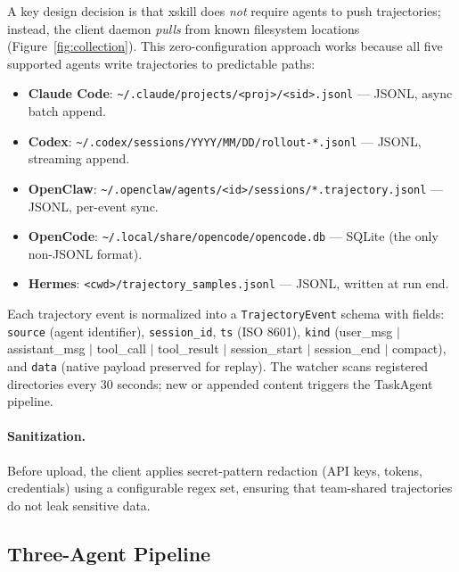 \documentclass[11pt]{article}
\begin{document}
A key design decision is that xskill does \emph{not} require agents to push trajectories; instead, the client daemon \emph{pulls} from known filesystem locations (Figure~\ref{fig:collection}). This zero-configuration approach works because all five supported agents write trajectories to predictable paths:

\begin{itemize}
    \item \textbf{Claude Code}: \texttt{\~{}/.claude/projects/<proj>/<sid>.jsonl} --- JSONL, async batch append.
    \item \textbf{Codex}: \texttt{\~{}/.codex/sessions/YYYY/MM/DD/rollout-*.jsonl} --- JSONL, streaming append.
    \item \textbf{OpenClaw}: \texttt{\~{}/.openclaw/agents/<id>/sessions/*.trajectory.jsonl} --- JSONL, per-event sync.
    \item \textbf{OpenCode}: \texttt{\~{}/.local/share/opencode/opencode.db} --- SQLite (the only non-JSONL format).
    \item \textbf{Hermes}: \texttt{<cwd>/trajectory\_samples.jsonl} --- JSONL, written at run end.
\end{itemize}

Each trajectory event is normalized into a \texttt{TrajectoryEvent} schema with fields: \texttt{source} (agent identifier), \texttt{session\_id}, \texttt{ts} (ISO 8601), \texttt{kind} (user\_msg $|$ assistant\_msg $|$ tool\_call $|$ tool\_result $|$ session\_start $|$ session\_end $|$ compact), and \texttt{data} (native payload preserved for replay). The watcher scans registered directories every 30 seconds; new or appended content triggers the TaskAgent pipeline.

\paragraph{Sanitization.} Before upload, the client applies secret-pattern redaction (API keys, tokens, credentials) using a configurable regex set, ensuring that team-shared trajectories do not leak sensitive data.

\subsection{Three-Agent Pipeline}
\label{sec:pipeline}
\end{document}
